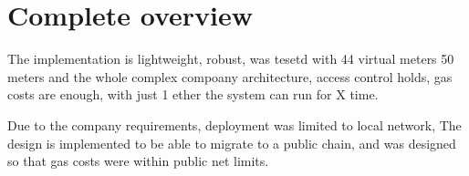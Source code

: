 \section{Complete overview}
The implementation is lightweight, robust, was tesetd with 44 virtual meters 50 meters and the whole complex compoany architecture, access control holds, gas costs are enough, with just 1 ether the system can run for X time.

Due to the company requirements, deployment was limited to local network, The design is implemented to be able to migrate to a public chain, and was designed so that gas costs were within public net limits.
